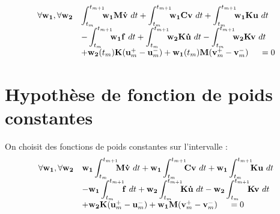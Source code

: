 \documentclass[12pt,a4paper]{report}
\begin{document}
\begin{equation}
\label{AvantHypotheseConst}
\begin{array}{r l}
	\forall \mathbf{w_1},\forall \mathbf{w_2}
	&\displaystyle
	 \int_{t_m}^{t_{m+1}} \!\!\! 	\mathbf{w_1}
		\mathbf{M}\mathbf{\dot{v}} ~dt
	 +\int_{t_m}^{t_{m+1}} \!\!\! 	\mathbf{w_1}
		\mathbf{C}\mathbf{v} ~dt
	 +\int_{t_m}^{t_{m+1}} \!\!\! 	\mathbf{w_1}
		\mathbf{K}\mathbf{u} ~dt
	\\
	  &\displaystyle
	   - \int_{t_m}^{t_{m+1}} \!\!\! 	\mathbf{w_1}
			\mathbf{f} ~dt		
	   + \int_{t_m}^{t_{m+1}} \!\!\! 
	    	\mathbf{w_2} \mathbf{K}\mathbf{\dot{u}}~dt 
	    -\int_{t_m}^{t_{m+1}} \!\!\! 
	    	\mathbf{w_2} \mathbf{K}     \mathbf{v} ~dt
	\\
	  &+ \mathbf{w_2}(t_m) \mathbf{K} (\mathbf{u}_m^+ - \mathbf{u}_m^-)
	   +  \mathbf{w_1}(t_m) \mathbf{M}(\mathbf{v}_m^+ - \mathbf{v}_m^-)
	~~~~=0
\end{array}
\end{equation}

\section{Hypothèse de fonction de poids constantes}

On choisit des fonctions de poids constantes sur l'intervalle :
\begin{equation}
\begin{array}{r l}
	\forall \mathbf{w_1},\forall \mathbf{w_2}
	&\displaystyle
	 \mathbf{w_1} \int_{t_m}^{t_{m+1}} \!\!\!
		\mathbf{M}\mathbf{\dot{v}} ~dt
	 +\mathbf{w_1} \int_{t_m}^{t_{m+1}} \!\!\!	
		\mathbf{C}\mathbf{v} ~dt
	 +\mathbf{w_1} \int_{t_m}^{t_{m+1}} \!\!\! 	
		\mathbf{K}\mathbf{u} ~dt
	\\
	  &\displaystyle
	   - \mathbf{w_1} \int_{t_m}^{t_{m+1}} \!\!\!
		 	\mathbf{f} ~dt		
	   + \mathbf{w_2} \int_{t_m}^{t_{m+1}} \!\!\! 
	    	\mathbf{K}\mathbf{\dot{u}}~dt 
	    -\mathbf{w_2} \int_{t_m}^{t_{m+1}} \!\!\! 
	    	\mathbf{K}     \mathbf{v} ~dt
	\\
	  &+ \mathbf{w_2} \mathbf{K} (\mathbf{u}_m^+ - \mathbf{u}_m^-)
	   +  \mathbf{w_1} \mathbf{M}(\mathbf{v}_m^+ - \mathbf{v}_m^-)
	~~~~=0
\end{array}
\end{equation}
\end{document}
